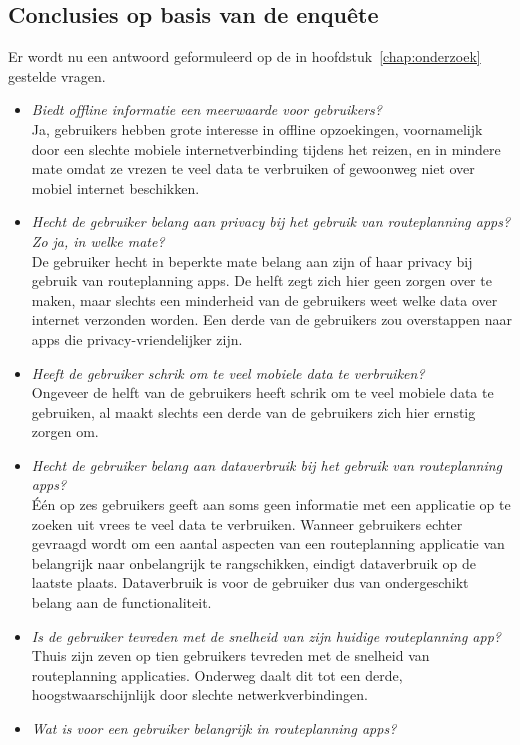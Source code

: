 \subsection{Conclusies op basis van de enquête}
Er wordt nu een antwoord geformuleerd op de in hoofdstuk~\ref{chap:onderzoek} gestelde vragen.
\begin{itemize}
	\item \textit{Biedt offline informatie een meerwaarde voor gebruikers?}\\
	Ja, gebruikers hebben grote interesse in offline opzoekingen, voornamelijk door een slechte mobiele internetverbinding tijdens het reizen, en in mindere mate omdat ze vrezen te veel data te verbruiken of gewoonweg niet over mobiel internet beschikken.
	\item \textit{Hecht de gebruiker belang aan privacy bij het gebruik van routeplanning apps? Zo ja, in welke mate?}\\
	De gebruiker hecht in beperkte mate belang aan zijn of haar privacy bij gebruik van routeplanning apps. De helft zegt zich hier geen zorgen over te maken, maar slechts een minderheid van de gebruikers weet welke data over internet verzonden worden. Een derde van de gebruikers zou overstappen naar apps die privacy-vriendelijker zijn.
	\item \textit{Heeft de gebruiker schrik om te veel mobiele data te verbruiken?}\\
	Ongeveer de helft van de gebruikers heeft schrik om te veel mobiele data te gebruiken, al maakt slechts een derde van de gebruikers zich hier ernstig zorgen om.
	\item \textit{Hecht de gebruiker belang aan dataverbruik bij het gebruik van routeplanning apps?}\\
	Één op zes gebruikers geeft aan soms geen informatie met een applicatie op te zoeken uit vrees te veel data te verbruiken. Wanneer gebruikers echter gevraagd wordt om een aantal aspecten van een routeplanning applicatie van belangrijk naar onbelangrijk te rangschikken, eindigt dataverbruik op de laatste plaats. Dataverbruik is voor de gebruiker dus van ondergeschikt belang aan de functionaliteit.
	\item \textit{Is de gebruiker tevreden met de snelheid van zijn huidige routeplanning app?}\\
	Thuis zijn zeven op tien gebruikers tevreden met de snelheid van routeplanning applicaties. Onderweg daalt dit tot een derde, hoogstwaarschijnlijk door slechte netwerkverbindingen.
	\item \textit{Wat is voor een gebruiker belangrijk in routeplanning apps?}\\

\end{itemize}

